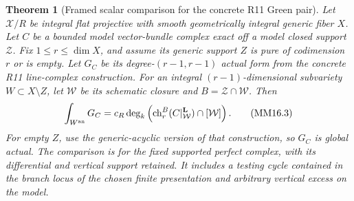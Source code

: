 \documentclass[11pt,a4paper]{article}
\newtheorem{theorem}{Theorem}[section]
\theoremstyle{definition}
\theoremstyle{remark}
\numberwithin{equation}{section}
\begin{document}
\begin{theorem}[Framed scalar comparison for the concrete R11 Green pair]
\label{r16mm:framed}
Let $\mathcal X/R$ be integral flat projective with smooth
geometrically integral generic fiber $X$. Let $C$ be a bounded
model vector-bundle complex exact off a model closed support
$\mathcal Z$. Fix $1\leq r\leq\dim X$, and assume its generic
support $Z$ is pure of codimension $r$ or is empty. Let $G_C$
be its degree-$(r-1,r-1)$ actual form from the
concrete R11 line-complex construction. For an integral
$(r-1)$-dimensional subvariety $W\subset X\setminus Z$, let
$\mathcal W$ be its schematic closure and
$B=\mathcal Z\cap\mathcal W$. Then
\[
 \int_{W^{\rm an}}G_C
       =c_R\deg_k\left(
          \operatorname{ch}_r^B(C|^{\mathbf L}_{\mathcal W})
                                  \cap[\mathcal W]\right).
 \tag{MM16.3}\label{r16mm:framed-eq}
\]
For empty $Z$, use the generic-acyclic version of that
construction, so $G_C$ is global actual. The comparison is for
the fixed supported perfect complex, with
its differential and vertical support retained. It includes a
testing cycle contained in the branch locus of the chosen finite
presentation and arbitrary vertical excess on the model.
\end{theorem}
\end{document}
